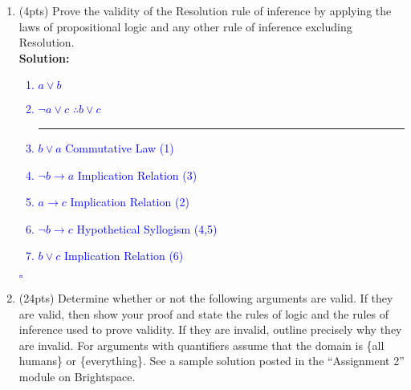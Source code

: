 \documentclass{article}
\renewcommand{\implies}{\rightarrow}
\newcommand{\sol}[1]{\textbf{Solution:\,}\textcolor{blue}{#1}}
\begin{document}
\begin{enumerate}
\item(4pts) Prove the validity of the Resolution rule of inference by applying the laws of propositional logic and any other rule of inference excluding Resolution.
\\\sol{
\begin{enumerate}[label =(\arabic*), ref = \arabic*]
	\item $a \lor b$
	\item $\neg a\lor c$ \hspace{50pt} $\therefore b\lor c$ \vspace{3pt}
	\vspace{5pt} \hrule \vspace{5pt}
	\item $b\lor a$ \hfill	Commutative Law (1)
	\item $\neg b \implies a$ \hfill	Implication Relation (3)
	\item $a \implies c$ \hfill	Implication Relation (2)
	\item $\neg b\implies c$ \hfill	Hypothetical Syllogism (4,5)
	\item $b\lor c$ \hfill	Implication Relation (6)
\end{enumerate} 
\hfill $\square$
}

\newpage

\item(24pts) Determine whether or not the following arguments are valid. If they are valid, then show your proof and state the rules of logic and the rules of inference used to prove validity. If they are invalid, outline precisely why they are invalid. For arguments with quantifiers assume that the domain is \{all humans\} or \{everything\}. See a sample solution posted in the ``Assignment 2'' module on Brightspace.


\end{enumerate}
\end{document}
